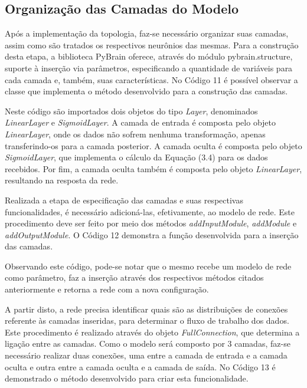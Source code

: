 

\subsection{Organização das Camadas do Modelo}
Após a implementação da topologia, faz-se necessário organizar suas camadas, assim como são tratados os respectivos neurônios das mesmas. Para a construção desta etapa, a biblioteca PyBrain oferece, através do módulo pybrain.structure, suporte à inserção via parâmetros, especificando a quantidade de variáveis para cada camada e, também, suas características. No Código 11 é possível observar a classe que implementa o método desenvolvido para a construção das camadas.



Neste código são importados dois objetos do tipo \textit{Layer}, denominados \textit{LinearLayer} e \textit{SigmoidLayer}. A camada de entrada é composta pelo objeto \textit{LinearLayer}, onde os dados não sofrem nenhuma transformação, apenas transferindo-os para a camada posterior. A camada oculta é composta pelo objeto \textit{SigmoidLayer}, que implementa o cálculo da Equação (3.4) para os dados recebidos. Por fim, a camada oculta também é composta pelo objeto \textit{LinearLayer}, resultando na resposta da rede.   

Realizada a etapa de especificação das camadas e suas respectivas funcionalidades, é necessário adicioná-las, efetivamente, ao modelo de rede. Este procedimento deve ser feito por meio dos métodos \textit{addInputModule}, \textit{addModule} e \textit{addOutputModule}. O Código 12 demonstra a função desenvolvida para a inserção das camadas.



Observando este código, pode-se notar que o mesmo recebe um modelo de rede como parâmetro, faz a inserção através dos respectivos métodos citados anteriormente e retorna a rede com a nova configuração.

A partir disto, a rede precisa identificar quais são as distribuições de conexões referente às camadas inseridas, para determinar o fluxo de trabalho dos dados. Este procedimento é realizado através do objeto \textit{FullConnection}, que determina a ligação entre as camadas. Como o modelo será composto por 3 camadas, faz-se necessário realizar duas conexões, uma entre a camada de entrada e a camada oculta e outra entre a camada oculta e a camada de saída. No Código 13 é demonstrado o método desenvolvido para criar esta funcionalidade.

